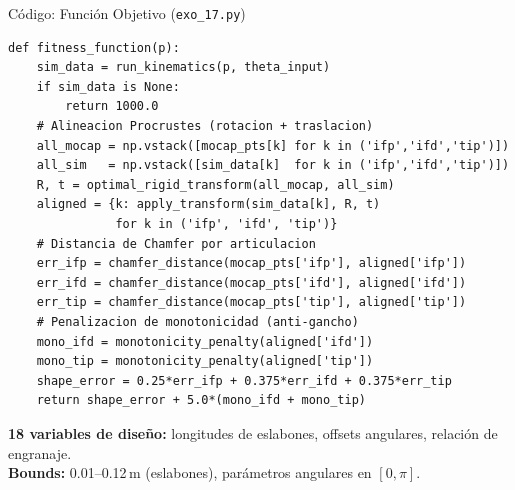 \documentclass[xcolor={table,dvipsnames}]{beamer}
\begin{document}
\begin{frame}[fragile]{C\'odigo: Funci\'on Objetivo (\texttt{exo\_17.py})}
\begin{lstlisting}[style=pythonstyle,basicstyle=\ttfamily\tiny]
def fitness_function(p):
    sim_data = run_kinematics(p, theta_input)
    if sim_data is None:
        return 1000.0
    # Alineacion Procrustes (rotacion + traslacion)
    all_mocap = np.vstack([mocap_pts[k] for k in ('ifp','ifd','tip')])
    all_sim   = np.vstack([sim_data[k]  for k in ('ifp','ifd','tip')])
    R, t = optimal_rigid_transform(all_mocap, all_sim)
    aligned = {k: apply_transform(sim_data[k], R, t)
               for k in ('ifp', 'ifd', 'tip')}
    # Distancia de Chamfer por articulacion
    err_ifp = chamfer_distance(mocap_pts['ifp'], aligned['ifp'])
    err_ifd = chamfer_distance(mocap_pts['ifd'], aligned['ifd'])
    err_tip = chamfer_distance(mocap_pts['tip'], aligned['tip'])
    # Penalizacion de monotonicidad (anti-gancho)
    mono_ifd = monotonicity_penalty(aligned['ifd'])
    mono_tip = monotonicity_penalty(aligned['tip'])
    shape_error = 0.25*err_ifp + 0.375*err_ifd + 0.375*err_tip
    return shape_error + 5.0*(mono_ifd + mono_tip)
\end{lstlisting}
    \scriptsize
    \vspace{0.1cm}
    \textbf{18 variables de dise\~no:} longitudes de eslabones, offsets angulares, relaci\'on de engranaje.\\
    \textbf{Bounds:} 0.01--0.12\,m (eslabones), par\'ametros angulares en $[0, \pi]$.
\end{frame}
\end{document}
